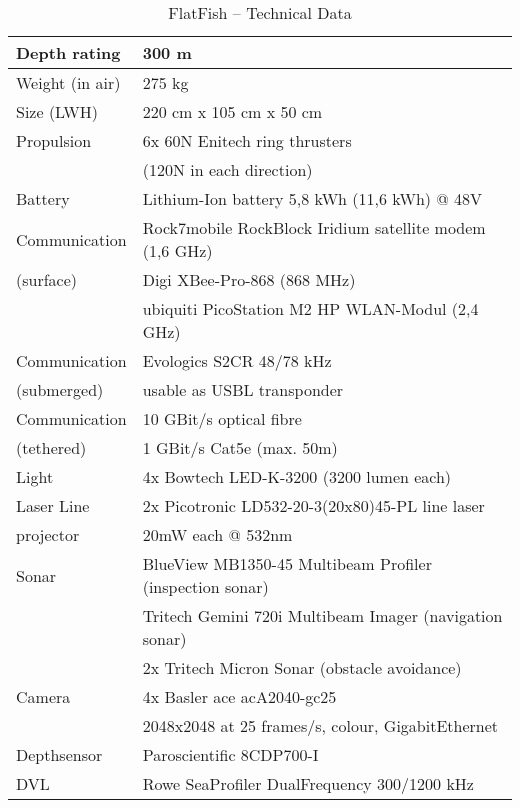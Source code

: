 \begin{table}[!t]
\renewcommand{\arraystretch}{1.3}
\caption{FlatFish -- Technical Data}
\label{tab:tech}
\centering
\begin{tabular}{|l|l|}
\hline
Depth rating 	  & 300 m \\ \hline

Weight (in air)		& 275 kg \\ \hline

Size (LWH)			&	220 cm x 105 cm x 50 cm \\ \hline

Propulsion			& 6x 60N Enitech ring thrusters \\
 & (120N in each direction) \\ \hline

Battery	 			&  Lithium-Ion battery 5,8 kWh (11,6 kWh) @ 48V\\ \hline 

Communication & Rock7mobile RockBlock Iridium satellite modem (1,6 GHz) \\
(surface) 		& Digi XBee-Pro-868 (868 MHz)\\
 & ubiquiti PicoStation M2 HP WLAN-Modul (2,4 GHz) \\ \hline

Communication & Evologics S2CR 48/78 kHz \\
(submerged)	&	usable as USBL transponder \\ \hline

Communication & 10 GBit/s optical fibre \\
(tethered)			& 1 GBit/s Cat5e (max. 50m) \\ \hline


Light	& 4x Bowtech LED-K-3200 (3200 lumen each) \\ \hline

Laser Line & 2x Picotronic LD532-20-3(20x80)45-PL line laser \\
projector & 20mW each @ 532nm \\ \hline

Sonar	& BlueView MB1350-45 Multibeam Profiler (inspection sonar) \\
 & Tritech Gemini 720i Multibeam Imager (navigation sonar) \\
 & 2x Tritech Micron Sonar (obstacle avoidance) \\ \hline
  
Camera	& 4x Basler ace acA2040-gc25 \\
	& 2048x2048 at 25 frames/s, colour, GigabitEthernet \\\hline
	
Depthsensor & Paroscientific 8CDP700-I \\

DVL &	Rowe SeaProfiler DualFrequency 300/1200 kHz \\ \hline
\end{tabular}
\end{table}
